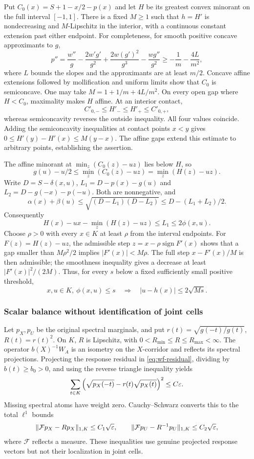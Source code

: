 Put $C_0(x)=S+1-x/2-p(x)$ and let $H$ be its greatest convex minorant
on the full interval $[-1,1]$. There is a fixed $M\ge1$ such that
$h=H'$ is nondecreasing and $M$-Lipschitz in the interior, with a
continuous constant extension past either endpoint.
For completeness, for smooth positive concave approximants to $g$,
\[
 p''=\frac{w''}{g}-\frac{2w'g'}{g^2}
       +\frac{2w(g')^2}{g^3}-\frac{wg''}{g^2}
       \ge-\frac1m-\frac{4L}{m^2},
\]
where $L$ bounds the slopes and the approximants are at least $m/2$.
Concave affine extensions followed by mollification and uniform limits
show that $C_0$ is semiconcave. One may take
$M=1+1/m+4L/m^2$. On every open gap where $H<C_0$, maximality makes
$H$ affine. At an interior contact,
\[
 C'_{0,-}\le H'_-\le H'_+\le C'_{0,+},
\]
whereas semiconcavity reverses the outside inequality. All four values
coincide. Adding the semiconcavity inequalities at contact points $x<y$
gives $0\le H'(y)-H'(x)\le M(y-x)$. The affine gaps extend this estimate
to arbitrary points, establishing the assertion.

The affine minorant at $\min_z(C_0(z)-uz)$ lies below $H$, so
\[
 g(u)-u/2\le\min_z(C_0(z)-uz)=\min_z(H(z)-uz).
\]
Write $D=S-\delta(x,u)$, $L_1=D-p(x)-g(u)$ and
$L_2=D-g(-x)-p(-u)$. Both are nonnegative, and
\[
 \alpha(x)+\beta(u)\le\sqrt{(D-L_1)(D-L_2)}
 \le D-(L_1+L_2)/2.
\]
Consequently
\begin{equation}\label{eq:wf-envelope-gap}
 H(x)-ux-\min_z(H(z)-uz)\le L_1\le2\phi(x,u).
\end{equation}
Choose $\rho>0$ with every $x\in K$ at least $\rho$ from the interval
endpoints. For $F(z)=H(z)-uz$, the admissible step
$z=x-\rho\operatorname{sign}F'(x)$ shows that a gap smaller than
$M\rho^2/2$ implies $|F'(x)|<M\rho$. The full step $x-F'(x)/M$ is
then admissible; the smoothness inequality gives a decrease at least
$|F'(x)|^2/(2M)$. Thus, for every $s$ below a fixed sufficiently small
positive threshold,
\begin{equation}\label{eq:wf-predictor}
 x,u\in K,\ \phi(x,u)\le s
 \quad\Longrightarrow\quad |u-h(x)|\le2\sqrt{Ms}.
\end{equation}

\subsubsection*{Scalar balance without identification of joint cells}

Let $p_X,p_U$ be the original spectral marginals, and put
$r(t)=\sqrt{g(-t)/g(t)}$, $R(t)=r(t)^2$. On $K$, $R$ is Lipschitz,
with $0<R_{\min}\le R\le R_{\max}<\infty$.
The operator $b(X)^{-1}W_A$ is an isometry on the $X$-corridor and
reflects its spectral projections. Projecting the response residual in
\eqref{eq:wf-residual}, dividing by $b(t)\ge b_0>0$, and using the
reverse triangle inequality yields
\[
 \sum_{t\in K}
 \left(\sqrt{p_X(-t)}-r(t)\sqrt{p_X(t)}\right)^2\le C\varepsilon.
\]
Missing spectral atoms have weight zero. Cauchy--Schwarz converts this
to the total $\ell^1$ bounds
\[
 \|\mathcal Fp_X-Rp_X\|_{1,K}\le C_1\sqrt{\varepsilon},\qquad
 \|\mathcal Fp_U-R^{-1}p_U\|_{1,K}\le C_2\sqrt{\varepsilon},
\]
where $\mathcal F$ reflects a measure. These inequalities use genuine
projected response vectors but not their localization in joint cells.


